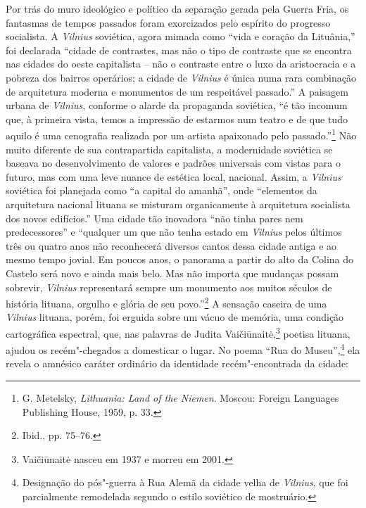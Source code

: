 Por trás do muro ideológico e político da separação gerada pela Guerra
Fria, os fantasmas de tempos passados foram exorcizados pelo espírito do
progresso socialista. A \textit{Vilnius} soviética, agora mimada como ``vida e
coração da Lituânia,'' foi declarada ``cidade de contrastes, mas não o
tipo de contraste que se encontra nas cidades do oeste capitalista -- não
o contraste entre o luxo da aristocracia e a pobreza dos bairros
operários; a cidade de \textit{Vilnius} é única numa rara combinação de
arquitetura moderna e monumentos de um respeitável passado.'' A paisagem
urbana de \textit{Vilnius}, conforme o alarde da propaganda soviética, ``é tão
incomum que, à primeira vista, temos a impressão de estarmos num teatro
e de que tudo aquilo é uma cenografia realizada por um artista
apaixonado pelo passado.''\footnote{G. Metelsky, \textit{Lithuania: Land of the Niemen}. Moscou: Foreign Languages Publishing House, 1959, p. 33.} Não muito diferente de sua contrapartida capitalista, a modernidade soviética se baseava no desenvolvimento de valores e padrões
universais com vistas para o futuro, mas com uma leve nuance de estética
local, nacional. Assim, a \textit{Vilnius} soviética foi planejada como ``a
capital do amanhã'', onde ``elementos da arquitetura nacional lituana se
misturam organicamente à arquitetura socialista dos novos edifícios.''
Uma cidade tão inovadora ``não tinha pares nem predecessores'' e
``qualquer um que não tenha estado em \textit{Vilnius} pelos últimos três ou
quatro anos não reconhecerá diversos cantos dessa cidade antiga e ao
mesmo tempo jovial. Em poucos anos, o panorama a partir do alto da
Colina do Castelo será novo e ainda mais belo. Mas não importa que
mudanças possam sobrevir, \textit{Vilnius} representará sempre um monumento aos
muitos séculos de história lituana, orgulho e glória de seu
povo.''\footnote{Ibid., pp. 75--76.} A sensação caseira de uma \textit{Vilnius}
lituana, porém, foi erguida sobre um vácuo de memória, uma condição
cartográfica espectral, que, nas palavras de Judita 
Vaičiūnaitė,\footnote{Vaičiūnaitė nasceu em 1937 e morreu em 2001.} poetisa lituana, ajudou os recém"-chegados a domesticar o
lugar. No poema ``Rua do Museu'',\footnote{Designação do pós"-guerra à Rua Alemã
da cidade velha de \textit{Vilnius}, que foi parcialmente remodelada segundo o
estilo soviético de mostruário.} ela revela o amnésico caráter ordinário
da identidade recém"-encontrada da cidade:

